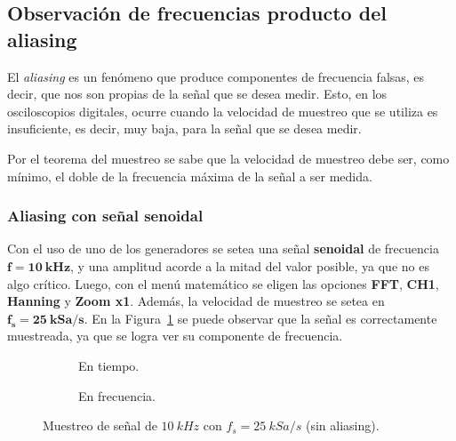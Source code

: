   \pagebreak
  \subsection{Observación de frecuencias producto del aliasing}
    El \textit{aliasing} es un fenómeno que produce componentes de frecuencia falsas, es decir,
    que nos son propias de la señal que se desea medir. Esto, en los osciloscopios digitales,
    ocurre cuando la velocidad de muestreo que se utiliza es insuficiente, es decir, muy baja,
    para la señal que se desea medir.
    
    Por el teorema del muestreo se sabe que la velocidad de muestreo debe ser, como mínimo, el
    doble de la frecuencia máxima de la señal a ser medida.

    \subsubsection{Aliasing con señal senoidal}
      Con el uso de uno de los generadores se setea una señal \textbf{senoidal} de frecuencia
      $\mathbf{f = 10~kHz}$, y una amplitud acorde a la mitad del valor posible, ya que no es
      algo crítico. Luego, con el menú matemático se eligen las opciones \textbf{FFT}, \textbf{CH1},
      \textbf{Hanning} y \textbf{Zoom x1}. Además, la velocidad de muestreo se setea en 
      $\mathbf{f_s = 25~kSa/s}$. En la Figura~\ref{fig:Exp3Señal10k} se puede observar que la señal 
      es correctamente muestreada, ya que se logra ver su componente de frecuencia.
      
      \begin{figure}[H]
        \centering
        \begin{subfigure}[H]{0.48\textwidth}
          \caption{En tiempo.}
        \end{subfigure}
        \hfill
        \begin{subfigure}[H]{0.48\textwidth}
          \caption{En frecuencia.}
        \end{subfigure}

        \caption{Muestreo de señal de $10~kHz$ con $f_s=25~kSa/s$ (sin aliasing).}
        \label{fig:Exp3Señal10k}
      \end{figure}
      
